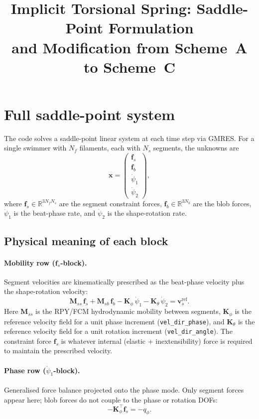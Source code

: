 \documentclass[11pt]{article}
\title{Implicit Torsional Spring: Saddle-Point Formulation\\
       and Modification from Scheme~A to Scheme~C}
\author{}
\date{}
\newcommand{\Kth}{\mathbf{K}_\theta}
\newcommand{\Mss}{\mathbf{M}_{ss}}
\begin{document}
\maketitle

\section{Full saddle-point system}

The code solves a saddle-point linear system at each time step via GMRES.
For a single swimmer with $N_f$ filaments, each with $N_s$ segments, the
unknowns are
\[
  \mathbf{x} =
  \begin{pmatrix}
    \mathbf{f}_s   \\[2pt]
    \mathbf{f}_b   \\[2pt]
    \dot\psi_1     \\[2pt]
    \dot\psi_2
  \end{pmatrix},
\]
where $\mathbf{f}_s\in\mathbb{R}^{3N_fN_s}$ are the segment constraint forces,
$\mathbf{f}_b\in\mathbb{R}^{3N_b}$ are the blob forces,
$\dot\psi_1$ is the beat-phase rate, and $\dot\psi_2$ is the
shape-rotation rate.

\subsection*{Physical meaning of each block}

\paragraph{Mobility row ($\mathbf{f}_s$-block).}
Segment velocities are kinematically prescribed as the beat-phase
velocity plus the shape-rotation velocity:
\[
  \Mss\,\mathbf{f}_s
  + \mathbf{M}_{sb}\,\mathbf{f}_b
  - \mathbf{K}_\phi\,\dot\psi_1
  - \Kth\,\dot\psi_2
  = \mathbf{v}_s^\mathrm{ref}.
\]
Here $\Mss$ is the RPY/FCM hydrodynamic mobility between segments,
$\mathbf{K}_\phi$ is the reference velocity field for a unit phase
increment (\texttt{vel\_dir\_phase}), and $\Kth$ is the reference
velocity field for a unit rotation increment (\texttt{vel\_dir\_angle}).
The constraint force $\mathbf{f}_s$ is whatever internal (elastic +
inextensibility) force is required to maintain the prescribed velocity.

\paragraph{Phase row ($\dot\psi_1$-block).}
Generalised force balance projected onto the phase mode.
Only segment forces appear here; blob forces do not couple to the phase
or rotation DOFs:
\[
  -\mathbf{K}_\phi^\top\mathbf{f}_s = -q_\phi.
\]
\end{document}
